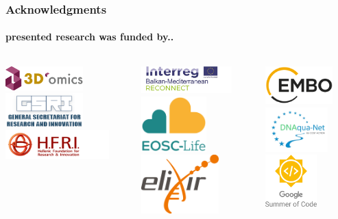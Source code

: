 \documentclass{beamer}
\begin{document}
   \begin{frame}
      \frametitle{Acknowledgments}
      \framesubtitle{presented research was funded by..}

      \begin{columns}[onlytextwidth]

            \includegraphics[width=30mm]{resources/3domics-logo.png}
            \includegraphics[width=30mm]{resources/thumbnail_gsri_logo_v2-en.png}
            \includegraphics[width=40mm]{resources/elidek_logo_en.png}
   
            \includegraphics[width=35mm]{resources/Acronym_Environment_RECONNECT_transp.png}
            \includegraphics[width=25mm]{resources/eosclogo.png}
            \includegraphics[width=30mm]{resources/Elixir-Europe-logo-1.png}

            \includegraphics[width=26mm]{resources/embo_logo.png}
            \includegraphics[width=24mm]{resources/dnaquanet_crop.png}
            \includegraphics[width=20mm]{resources/GSoC_logo.svg.png}

      \end{columns}

   \end{frame}
\end{document}
